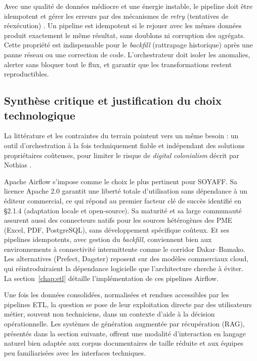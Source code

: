 Avec une qualité de données médiocre et une énergie instable, le pipeline doit être idempotent et gérer les erreurs par des mécanismes de \textit{retry} (tentatives de réexécution) \cite{reisFundamentalsDataEngineering2022}. Un pipeline est idempotent si le rejouer avec les mêmes données produit exactement le même résultat, sans doublons ni corruption des agrégats. Cette propriété est indispensable pour le \textit{backfill} (rattrapage historique) après une panne réseau ou une correction de code. L'orchestrateur doit isoler les anomalies, alerter sans bloquer tout le flux, et garantir que les transformations restent reproductibles.

\subsection{Synthèse critique et justification du choix technologique}

La littérature et les contraintes du terrain pointent vers un même besoin : un outil d'orchestration à la fois techniquement fiable et indépendant des solutions propriétaires coûteuses, pour limiter le risque de \textit{digital colonialism} décrit par Nothias \cite{nothiasIntellectualHistoryDigital2025}.

Apache Airflow s'impose comme le choix le plus pertinent pour SOYAFF. Sa licence Apache 2.0 garantit une liberté totale d'utilisation sans dépendance à un éditeur commercial, ce qui répond au premier facteur clé de succès identifié en §2.1.4 (adaptation locale et open-source). Sa maturité et sa large communauté assurent aussi des connecteurs natifs pour les sources hétérogènes des PME (Excel, PDF, PostgreSQL), sans développement spécifique coûteux. Et ses pipelines idempotents, avec gestion du \textit{backfill}, conviennent bien aux environnements à connectivité intermittente comme le corridor Dakar--Bamako. Les alternatives (Prefect, Dagster) reposent sur des modèles commerciaux cloud, qui réintroduiraient la dépendance logicielle que l'architecture cherche à éviter. La section~\ref{chap:etl} détaille l'implémentation de ces pipelines Airflow.

Une fois les données consolidées, normalisées et rendues accessibles par les pipelines ETL, la question se pose de leur exploitation directe par des utilisateurs métier, souvent non techniciens, dans un contexte d'aide à la décision opérationnelle. Les systèmes de génération augmentée par récupération (RAG), présentés dans la section suivante, offrent une modalité d'interaction en langage naturel bien adaptée aux corpus documentaires de taille réduite et aux équipes peu familiarisées avec les interfaces techniques.

